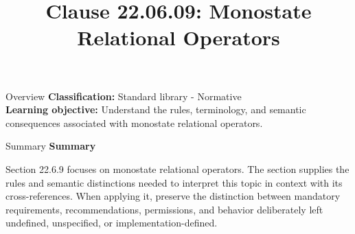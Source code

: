 \documentclass[10pt,letterpaper]{article}
\title{Clause 22.06.09: Monostate Relational Operators}
\author{}
\date{}
\begin{document}
\maketitle
\begin{CornellOverviewBox}{Overview}
\textbf{Classification:} Standard library - Normative\\[2pt]
\textbf{Learning objective:} Understand the rules, terminology, and semantic consequences associated with monostate relational operators.
\end{CornellOverviewBox}\begin{CornellSummaryBox}{Summary}
{\sffamily\bfseries\color{Accent} Summary}\par\vspace{3pt}Section 22.6.9 focuses on monostate relational operators. The section supplies the rules and semantic distinctions needed to interpret this topic in context with its cross-references. When applying it, preserve the distinction between mandatory requirements, recommendations, permissions, and behavior deliberately left undefined, unspecified, or implementation-defined.
\end{CornellSummaryBox}
\end{document}
